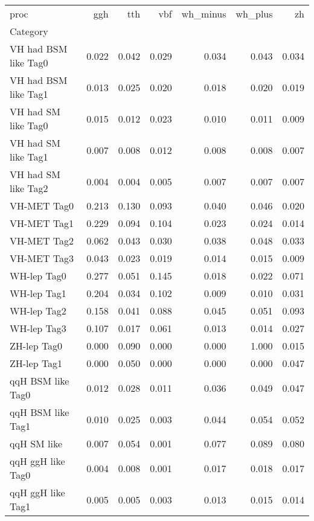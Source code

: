 \begin{tabular}{lrrrrrr}
\toprule
proc &    ggh &    tth &    vbf &  wh_{minus} &  wh_{plus} &     zh \\
Category             &        &        &        &             &            &        \\
\midrule
VH had BSM like Tag0 &  0.022 &  0.042 &  0.029 &       0.034 &      0.043 &  0.034 \\
VH had BSM like Tag1 &  0.013 &  0.025 &  0.020 &       0.018 &      0.020 &  0.019 \\
VH had SM like Tag0  &  0.015 &  0.012 &  0.023 &       0.010 &      0.011 &  0.009 \\
VH had SM like Tag1  &  0.007 &  0.008 &  0.012 &       0.008 &      0.008 &  0.007 \\
VH had SM like Tag2  &  0.004 &  0.004 &  0.005 &       0.007 &      0.007 &  0.007 \\
VH-MET Tag0          &  0.213 &  0.130 &  0.093 &       0.040 &      0.046 &  0.020 \\
VH-MET Tag1          &  0.229 &  0.094 &  0.104 &       0.023 &      0.024 &  0.014 \\
VH-MET Tag2          &  0.062 &  0.043 &  0.030 &       0.038 &      0.048 &  0.033 \\
VH-MET Tag3          &  0.043 &  0.023 &  0.019 &       0.014 &      0.015 &  0.009 \\
WH-lep Tag0          &  0.277 &  0.051 &  0.145 &       0.018 &      0.022 &  0.071 \\
WH-lep Tag1          &  0.204 &  0.034 &  0.102 &       0.009 &      0.010 &  0.031 \\
WH-lep Tag2          &  0.158 &  0.041 &  0.088 &       0.045 &      0.051 &  0.093 \\
WH-lep Tag3          &  0.107 &  0.017 &  0.061 &       0.013 &      0.014 &  0.027 \\
ZH-lep Tag0          &  0.000 &  0.090 &  0.000 &       0.000 &      1.000 &  0.015 \\
ZH-lep Tag1          &  0.000 &  0.050 &  0.000 &       0.000 &      0.000 &  0.047 \\
qqH BSM like Tag0    &  0.012 &  0.028 &  0.011 &       0.036 &      0.049 &  0.047 \\
qqH BSM like Tag1    &  0.010 &  0.025 &  0.003 &       0.044 &      0.054 &  0.052 \\
qqH SM like          &  0.007 &  0.054 &  0.001 &       0.077 &      0.089 &  0.080 \\
qqH ggH like Tag0    &  0.004 &  0.008 &  0.001 &       0.017 &      0.018 &  0.017 \\
qqH ggH like Tag1    &  0.005 &  0.005 &  0.003 &       0.013 &      0.015 &  0.014 \\
\bottomrule
\end{tabular}
